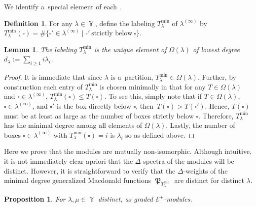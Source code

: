 \documentclass[10pt,a4paper]{amsart}
\numberwithin{equation}{section}
\newtheorem{Lemma}[Theorem]{Lemma}
\newtheorem{Proposition}[Theorem]{Proposition}
\theoremstyle{definition}
\newtheorem{Definition}[Theorem]{Definition}
\DeclareMathOperator{\Par}{\mathbb{Y}}
\DeclareMathOperator{\MacD}{\mathfrak{P}}
\begin{document}
We identify a~special element of each .

\begin{Definition}
 For any $\lambda \in \Par$, define the labeling $T^{\min}_{\lambda}$ of $\lambda^{(\infty)}$ by
$ T^{\min}_{\lambda}(\square)= \#\big\{ \square' \in \lambda^{(\infty)} \mid \square' ~\text{strictly below} ~\square\big\}$.
\end{Definition}

\begin{Lemma}\label{lowest labeling}
The labeling $T^{\min}_{\lambda}$ is the unique element of $\Omega(\lambda)$ of lowest degree $d_{\lambda}:= \sum_{i \geq 1} i\lambda_i$.
\end{Lemma}

\begin{proof}
 It is immediate that since $\lambda$ is a~partition, $T^{\min}_{\lambda} \in \Omega(\lambda)$. Further, by construction each entry of $T^{\min}_{\lambda}$ is chosen minimally in that for any $T \in \Omega(\lambda)$ and $\square \in \lambda^{(\infty)}$, $T^{\min}_{\lambda}(\square) \leq T(\square)$. To see this, simply note that if $T \in \Omega(\lambda)$, $\square \in \lambda^{(\infty)}$, and $\square'$ is the box directly below $\square$, then~${T(\square)> T(\square')}$.
 Hence, $T(\square)$ must be at least as large as the number of boxes strictly below $\square$. Therefore, $T^{\min}_{\lambda}$ has the minimal degree among all elements of $\Omega(\lambda)$. Lastly, the number of boxes $\square \in \lambda^{(\infty)}$ with $T^{\min}_{\lambda}(\square) = i$ is $\lambda_i$ so  as defined above.
\end{proof}

Here we prove that the modules  are mutually non-isomorphic. Although intuitive, it is not immediately clear apriori that the $\Delta$-spectra of the modules  will be distinct. However, it is straightforward to verify that the $\Delta$-weights of the minimal degree generalized Macdonald functions $\MacD_{T^{\min}_{\lambda}}$ are distinct for distinct $\lambda$.

\begin{Proposition}
 For $\lambda, \mu \in \Par$ distinct,  as graded $\mathcal{E}^{+}$-modules.
\end{Proposition}
\end{document}
